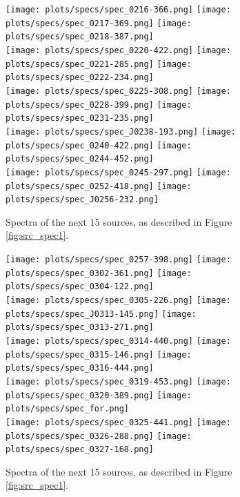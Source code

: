 \documentclass[preprint]{aastex}
\begin{document}
\begin{figure}\centering
\texttt{[image: plots/specs/spec\_0216-366.png]}
\texttt{[image: plots/specs/spec\_0217-369.png]}
\texttt{[image: plots/specs/spec\_0218-387.png]}\\
\texttt{[image: plots/specs/spec\_0220-422.png]}
\texttt{[image: plots/specs/spec\_0221-285.png]}
\texttt{[image: plots/specs/spec\_0222-234.png]}\\
\texttt{[image: plots/specs/spec\_0225-308.png]}
\texttt{[image: plots/specs/spec\_0228-399.png]}
\texttt{[image: plots/specs/spec\_0231-235.png]}\\
\texttt{[image: plots/specs/spec\_J0238-193.png]}
\texttt{[image: plots/specs/spec\_0240-422.png]}
\texttt{[image: plots/specs/spec\_0244-452.png]}\\
\texttt{[image: plots/specs/spec\_0245-297.png]}
\texttt{[image: plots/specs/spec\_0252-418.png]}
\texttt{[image: plots/specs/spec\_J0256-232.png]}\\
\caption{Spectra of the next 15 sources, as described in Figure \ref{fig:src_spec1}.
}\label{fig:src_spec6}
\end{figure}\clearpage

\begin{figure}\centering
\texttt{[image: plots/specs/spec\_0257-398.png]}
\texttt{[image: plots/specs/spec\_0302-361.png]}
\texttt{[image: plots/specs/spec\_0304-122.png]}\\
\texttt{[image: plots/specs/spec\_0305-226.png]}
\texttt{[image: plots/specs/spec\_J0313-145.png]}
\texttt{[image: plots/specs/spec\_0313-271.png]}\\
\texttt{[image: plots/specs/spec\_0314-440.png]}
\texttt{[image: plots/specs/spec\_0315-146.png]}
\texttt{[image: plots/specs/spec\_0316-444.png]}\\
\texttt{[image: plots/specs/spec\_0319-453.png]}
\texttt{[image: plots/specs/spec\_0320-389.png]}
\texttt{[image: plots/specs/spec\_for.png]}\\
\texttt{[image: plots/specs/spec\_0325-441.png]}
\texttt{[image: plots/specs/spec\_0326-288.png]}
\texttt{[image: plots/specs/spec\_0327-168.png]}\\
\caption{Spectra of the next 15 sources, as described in Figure \ref{fig:src_spec1}.
}\label{fig:src_spec7}
\end{figure}\clearpage
\end{document}
